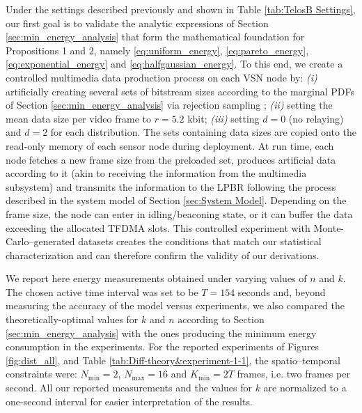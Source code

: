 \documentclass[twocolumn,english]{IEEEtran}
\theoremstyle{plain}
\theoremstyle{definition}
\begin{document}
Under the settings described previously and shown in Table \ref{tab:TelosB Settings},
our first goal is to validate the analytic expressions of Section
\ref{sec:min_energy_analysis} that form the mathematical foundation
for Propositions 1 and 2, namely \eqref{eq:uniform_energy}, \eqref{eq:pareto_energy},
\eqref{eq:exponential_energy} and \eqref{eq:halfgaussian_energy}.
To this end, we create a controlled multimedia data production process
on each VSN node by: \emph{(i)} artificially creating several sets
of bitstream sizes according to the marginal PDFs of Section \ref{sec:min_energy_analysis}
via rejection sampling \cite{gilks1992adaptive}; \emph{(ii)} setting
the mean data size per video frame to $r=5.2$ kbit; \emph{(iii)}
setting $d=0$ (no relaying) and $d=2$ for each distribution. The
sets containing data sizes are copied onto the read-only memory of
each sensor node during deployment. At run time, each node fetches
a new frame size from the preloaded set, produces artificial data
according to it (akin to receiving the information from the multimedia
subsystem) and transmits the information to the LPBR following the
process described in the system model of Section \ref{sec:System Model}.
Depending on the frame size, the node can enter in idling/beaconing
state, or it can buffer the data exceeding the allocated TFDMA slots.
This controlled experiment with Monte-Carlo--generated datasets creates
the conditions that match our statistical characterization and can
therefore confirm the validity of our derivations. 

We report here energy measurements obtained under varying values of
$n$ and $k$. The chosen active time interval was set to be $T=154$
seconds and, beyond measuring the accuracy of the model versus experiments,
we also compared the theoretically-optimal values for $k$ and $n$
according to Section \ref{sec:min_energy_analysis} with the ones
producing the minimum energy consumption in the experiments. For the
reported experiments of Figures \ref{fig:dist_all}, and Table \ref{tab:Diff-theory&experiment-1-1},
the spatio--temporal constraints were: $N_{\min}=2$, $N_{\max}=16$
and $K_{\min}=2T$ frames, i.e. two frames per second. All our reported
measurements and the values for $k$ are normalized to a one-second
interval for easier interpretation of the results.
\end{document}
